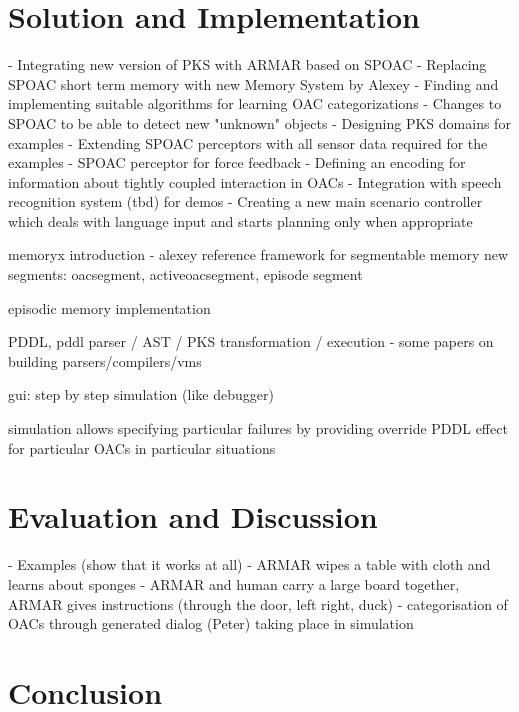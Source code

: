 \documentclass[english,ngerman]{KITreprt}
\begin{document}
\chapter{Solution and Implementation}
- Integrating new version of PKS with ARMAR based on SPOAC
- Replacing SPOAC short term memory with new Memory System by Alexey
- Finding and implementing suitable algorithms for learning OAC categorizations
- Changes to SPOAC to be able to detect new "unknown" objects
- Designing PKS domains for examples
- Extending SPOAC perceptors with all sensor data required for the examples
- SPOAC perceptor for force feedback
- Defining an encoding for information about tightly coupled interaction in OACs
- Integration with speech recognition system (tbd) for demos
- Creating a new main scenario controller which deals with language input and
  starts planning only when appropriate


memoryx introduction - alexey reference
framework for segmentable memory
new segments: oacsegment, activeoacsegment, episode segment

episodic memory implementation

PDDL, pddl parser / AST / PKS transformation / execution - some papers on building parsers/compilers/vms

gui: step by step simulation (like debugger)

simulation allows specifying particular failures by providing override PDDL effect for particular OACs in particular situations

\chapter{Evaluation and Discussion}
- Examples (show that it works at all)
  - ARMAR wipes a table with cloth and learns about sponges
  - ARMAR and human carry a large board together, ARMAR gives instructions
    (through the door, left right, duck)
- categorisation of OACs through generated dialog (Peter) taking place in simulation

\chapter{Conclusion}





\end{document}
